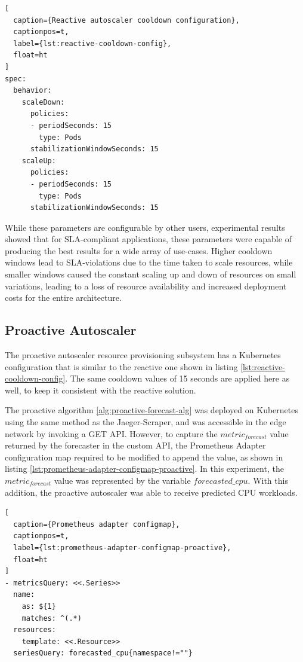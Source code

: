\begin{lstlisting}[
  caption={Reactive autoscaler cooldown configuration},
  captionpos=t,
  label={lst:reactive-cooldown-config},
  float=ht
]
spec:
  behavior:
    scaleDown:
      policies:
      - periodSeconds: 15
        type: Pods
      stabilizationWindowSeconds: 15
    scaleUp:
      policies:
      - periodSeconds: 15
        type: Pods
      stabilizationWindowSeconds: 15
\end{lstlisting}

While these parameters are configurable by other users, experimental results showed that for SLA-compliant applications, these parameters were capable of producing the best results for a wide array of use-cases. Higher cooldown windows lead to SLA-violations due to the time taken to scale resources, while smaller windows caused the constant scaling up and down of resources on small variations, leading to a loss of resource availability and increased deployment costs for the entire architecture.

\subsection{Proactive Autoscaler}
\label{subsec:ch5-proactive-auto-subsection}

The proactive autoscaler resource provisioning subsystem has a Kubernetes configuration that is similar to the reactive one shown in listing \ref{lst:reactive-cooldown-config}. The same cooldown values of 15 seconds are applied here as well, to keep it consistent with the reactive solution.\par

The proactive algorithm \ref{alg:proactive-forecast-alg} was deployed on Kubernetes using the same method as the Jaeger-Scraper, and was accessible in the edge network by invoking a GET API. However, to capture the $metric_{forecast}$ value returned by the forecaster in the custom API, the Prometheus Adapter configuration map required to be modified to append the value, as shown in listing \ref{lst:prometheus-adapter-configmap-proactive}. In this experiment, the $metric_{forecast}$ value was represented by the variable $forecasted\_cpu$. With this addition, the proactive autoscaler was able to receive predicted CPU workloads.\par

\begin{lstlisting}[
  caption={Prometheus adapter configmap},
  captionpos=t,
  label={lst:prometheus-adapter-configmap-proactive},
  float=ht
]
- metricsQuery: <<.Series>>
  name:
    as: ${1}
    matches: ^(.*)
  resources:
    template: <<.Resource>>
  seriesQuery: forecasted_cpu{namespace!=""}
\end{lstlisting}

